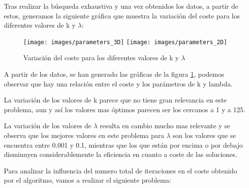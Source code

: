 \documentclass{article}
\begin{document}
\begin{enumerate}
  Tras realizar la búsqueda exhaustiva y una vez obtenidos los datos, a partir de estos, generamos la siguiente gráfica que muestra la variación del coste para los diferentes valores de k y ${\lambda}$:

   \begin{figure}[htp]
    \centering
    \texttt{[image: images/parameters\_3D]}\hfill
    \texttt{[image: images/parameters\_2D]}\hfill
    \caption{Variación del coste para los diferentes valores de k y ${\lambda}$}
    \label{fig:CC}
  \end{figure}
  A partir de los datos, se han generado las gráficas de la figura \ref{fig:CC}, podemos observar que hay una relación entre el coste y los parámetros de k y lambda.\par
  La variación de los valores de k parece que no tiene gran relevancia en este problema, aun y así los valores mas óptimos parecen ser los cercanos a 1 y a 125.\par
  La variación de los valores de ${\lambda}$ resulta en cambio mucho mas relevante y se observa que los mejores valores en este problema para ${\lambda}$ son los valores que se encuentra entre 0.001 y 0.1, mientras que los que están por encima o por debajo disminuyen considerablemente la eficiencia en cuanto a coste de las soluciones.\par
  Para analizar la influencia del numero total de iteraciones en el coste obtenido por el algoritmo, vamos a realizar el siguiente problema:


\end{enumerate}
\end{document}

